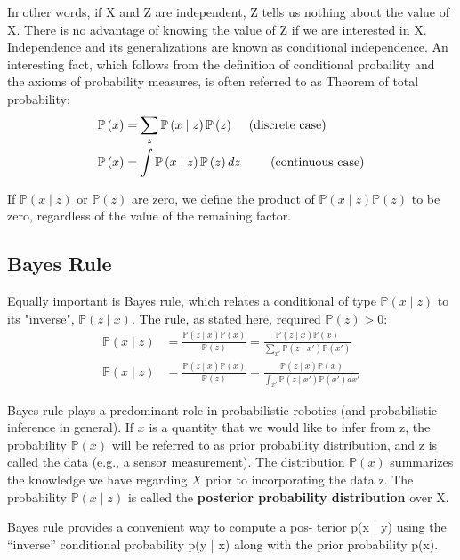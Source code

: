 \documentclass[14pt,letterpaper]{article}
\theoremstyle{definition}
\newcommand{\prob}[1]{\mathbb{P}\left(#1\right)}
\begin{document}
In other words, if X and Z are independent, Z tells us nothing about the value of X. There is no advantage of knowing the value of Z if we are interested in X.
Independence and its generalizations are known as conditional independence.
An interesting fact, which follows from the definition of conditional probaility and the axioms of probability measures, is often referred to as Theorem of total probability:
\begin{align}
  \prob{x} &= \sum_{z}{\prob{x \mid z}\prob{z}}  \hspace{5mm}  \text{(discrete case)}\\
  \prob{x} &= \int{\prob{x \mid z}\prob{z} dz} \hspace{8.5mm} \text{(continuous case)}
\end{align}

If $\prob{x \mid z}$ or $\prob{z}$ are zero, we define the product of $\prob{x \mid z}\prob{z}$ to be zero, regardless of the value of the remaining factor.

\subsection{Bayes Rule}
Equally important is Bayes rule, which relates a conditional of type $\prob{x \mid z}$ to its "inverse", $\prob{z \mid x}$.
The rule, as stated here, required $\prob{z}>0$:
\begin{align}
  \prob{x \mid z} &= \frac{\prob{z \mid x}\prob{x}}{\prob{z}} = \frac{\prob{z \mid x}\prob{x}}{\sum_{x'}{\prob{z \mid x'}\prob{x'}}} \\
  \prob{x \mid z} &= \frac{\prob{z \mid x}\prob{x}}{\prob{z}} = \frac{\prob{z \mid x}\prob{x}}{\int_{x'}{\prob{z \mid x'}\prob{x'}dx'}}
\end{align}

Bayes rule plays a predominant role in probabilistic robotics (and probabilistic inference in general). If $x$ is a quantity that we would like to infer from z, the probability $\prob{x}$ will be referred to as prior probability distribution, and z is called the data (e.g., a sensor measurement).
The distribution $\prob{x}$ summarizes the knowledge we have regarding $X$ prior to incorporating the data z. The probability $\prob{x \mid z}$ is called the \textbf{posterior probability distribution} over X.
\newpage

Bayes rule provides a convenient way to compute a pos-
terior p(x | y) using the “inverse” conditional probability p(y | x) along with
the prior probability p(x).
\end{document}
